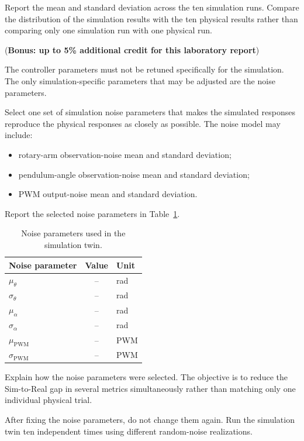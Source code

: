 \documentclass[11pt,a4paper]{article}
\begin{document}
Report the mean and standard deviation across the ten simulation runs.
Compare the distribution of the simulation results with the ten physical
results rather than comparing only one simulation run with one physical run.



(\textbf{Bonus: up to 5\% additional credit for this laboratory report})


The controller parameters must not be retuned specifically for the simulation.
The only simulation-specific parameters that may be adjusted are the noise
parameters.

Select one set of simulation noise parameters that makes the simulated
responses reproduce the physical responses as closely as possible. The noise
model may include:

\begin{itemize}
    \item rotary-arm observation-noise mean and standard deviation;
    \item pendulum-angle observation-noise mean and standard deviation;
    \item PWM output-noise mean and standard deviation.
\end{itemize}

Report the selected noise parameters in Table~\ref{tab:sim_noise}.

\begin{table}[H]
\centering
\caption{Noise parameters used in the simulation twin.}
\label{tab:sim_noise}
\small
\begin{tabularx}{0.78\linewidth}{l c l}
\toprule
Noise parameter & Value & Unit\\
\midrule
$\mu_{\theta}$ & -- & rad\\
$\sigma_{\theta}$ & -- & rad\\
$\mu_{\alpha}$ & -- & rad\\
$\sigma_{\alpha}$ & -- & rad\\
$\mu_{\mathrm{PWM}}$ & -- & PWM\\
$\sigma_{\mathrm{PWM}}$ & -- & PWM\\
\bottomrule
\end{tabularx}
\end{table}

Explain how the noise parameters were selected. The objective is to reduce
the Sim-to-Real gap in several metrics simultaneously rather than matching
only one individual physical trial.

After fixing the noise parameters, do not change them again. Run the
simulation twin ten independent times using different random-noise
realizations.
\end{document}
